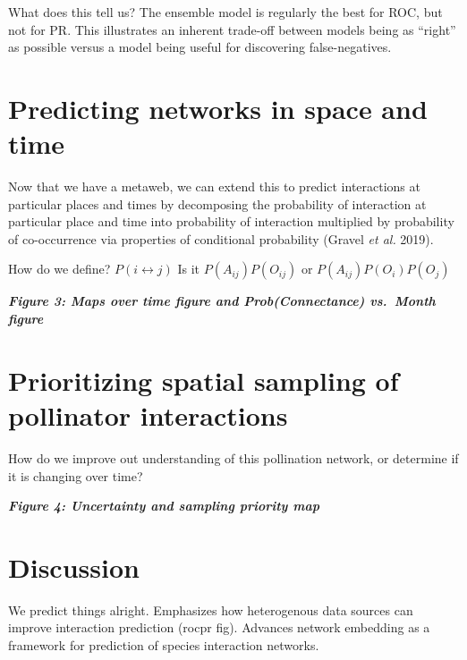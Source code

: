 \documentclass[11pt]{article}
\begin{document}
What does this tell us? The ensemble model is regularly the best for
ROC, but not for PR. This illustrates an inherent trade-off between
models being as ``right'' as possible versus a model being useful for
discovering false-negatives.

\hypertarget{predicting-networks-in-space-and-time}{%
\section{Predicting networks in space and
time}\label{predicting-networks-in-space-and-time}}

Now that we have a metaweb, we can extend this to predict interactions
at particular places and times by decomposing the probability of
interaction at particular place and time into probability of interaction
multiplied by probability of co-occurrence via properties of conditional
probability (Gravel \emph{et al.} 2019).

How do we define? \(P(i \leftrightarrow j)\) Is it
\(P(A_{ij})P(O_{ij})\) or \(P(A_{ij})P(O_i)P(O_j)\)

\textbf{\emph{Figure 3: Maps over time figure and Prob(Connectance)
vs.~Month figure}}

\hypertarget{prioritizing-spatial-sampling-of-pollinator-interactions}{%
\section{Prioritizing spatial sampling of pollinator
interactions}\label{prioritizing-spatial-sampling-of-pollinator-interactions}}

How do we improve out understanding of this pollination network, or
determine if it is changing over time?

\textbf{\emph{Figure 4: Uncertainty and sampling priority map}}

\hypertarget{discussion}{%
\section{Discussion}\label{discussion}}

We predict things alright. Emphasizes how heterogenous data sources can
improve interaction prediction (rocpr fig). Advances network embedding
as a framework for prediction of species interaction networks.
\end{document}
